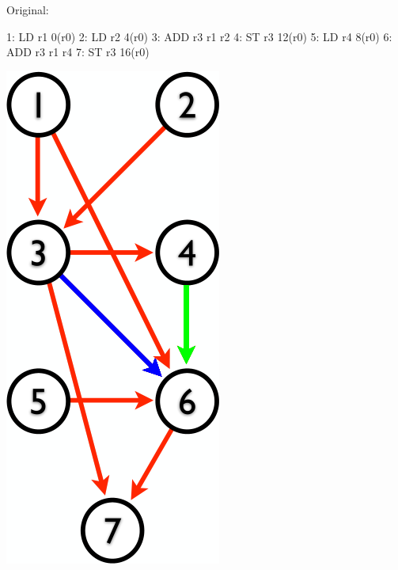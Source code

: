 \documentclass[a4paper, 11pt]{article}
\begin{document}
{    \begin{minipage}[t]{0.3\textwidth}
    Original:
    \vspace{-5mm}
    \begin{monospacefigure}
    1: LD   r1  0(r0)
    2: LD   r2  4(r0)
    3: ADD  r3  r1      r2
    4: ST   r3  12(r0)
    5: LD   r4  8(r0)
    6: ADD  r3  r1      r4
    7: ST   r3  16(r0)
    \end{monospacefigure}
    \end{minipage}
    \hspace{1mm}
    \begin{minipage}[t]{0.2\textwidth}
    \vspace{0pt}
    \includegraphics[width=\textwidth]{dependency-graph.png}

\end{minipage}}
\end{document}
